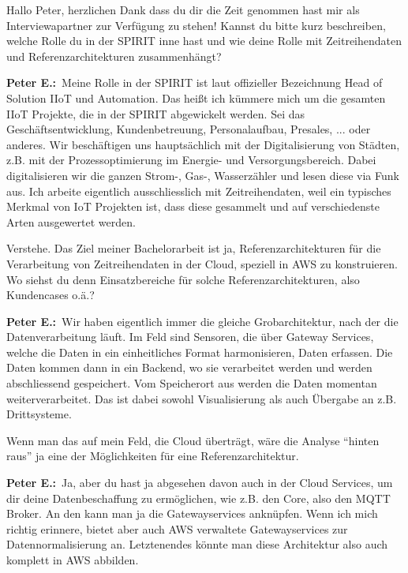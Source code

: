 
\newcommand{\PE}{\textbf{Peter E.:}~}

\LF Hallo Peter, herzlichen Dank dass du dir die Zeit genommen hast mir als Interviewapartner zur Verfügung zu stehen! Kannst du bitte kurz beschreiben, welche Rolle du in der SPIRIT inne hast und wie deine Rolle mit Zeitreihendaten und Referenzarchitekturen zusammenhängt?

\PE Meine Rolle in der SPIRIT ist laut offizieller Bezeichnung Head of Solution \ac{IIoT} und Automation. Das heißt ich kümmere mich um die gesamten \ac{IIoT} Projekte, die in der SPIRIT abgewickelt werden. Sei das Geschäftsentwicklung, Kundenbetreuung, Personalaufbau, Presales, ... oder anderes. Wir beschäftigen uns hauptsächlich mit der Digitalisierung von Städten, z.B. mit der Prozessoptimierung im Energie- und Versorgungsbereich. Dabei digitalisieren wir die ganzen Strom-, Gas-, Wasserzähler und lesen diese via Funk aus. Ich arbeite eigentlich ausschliesslich mit Zeitreihendaten, weil ein typisches Merkmal von \ac{IoT} Projekten ist, dass diese gesammelt und auf verschiedenste Arten ausgewertet werden. 

\LF Verstehe. Das Ziel meiner Bachelorarbeit ist ja, Referenzarchitekturen für die Verarbeitung von Zeitreihendaten in der Cloud, speziell in \ac{AWS} zu konstruieren. Wo siehst du denn Einsatzbereiche für solche Referenzarchitekturen, also Kundencases o.ä.? 

\PE Wir haben eigentlich immer die gleiche Grobarchitektur, nach der die Datenverarbeitung läuft. Im Feld sind Sensoren, die über Gateway Services, welche die Daten in ein einheitliches Format harmonisieren, Daten erfassen. Die Daten kommen dann in ein Backend, wo sie verarbeitet werden und werden abschliessend gespeichert. Vom Speicherort aus werden die Daten momentan weiterverarbeitet. Das ist dabei sowohl Visualisierung als auch Übergabe an z.B. Drittsysteme. 

\LF Wenn man das auf mein Feld, die Cloud überträgt, wäre die Analyse \enquote{hinten raus} ja eine der Möglichkeiten für eine Referenzarchitektur.

\PE Ja, aber du hast ja abgesehen davon auch in der Cloud Services, um dir deine Datenbeschaffung zu ermöglichen, wie z.B. den \AWSIOT Core, also den \ac{MQTT} Broker. An den kann man ja die Gatewayservices anknüpfen. Wenn ich mich richtig erinnere, bietet aber auch \ac{AWS} verwaltete Gatewayservices zur Datennormalisierung an. Letztenendes könnte man diese Architektur also auch komplett in \ac{AWS} abbilden.

